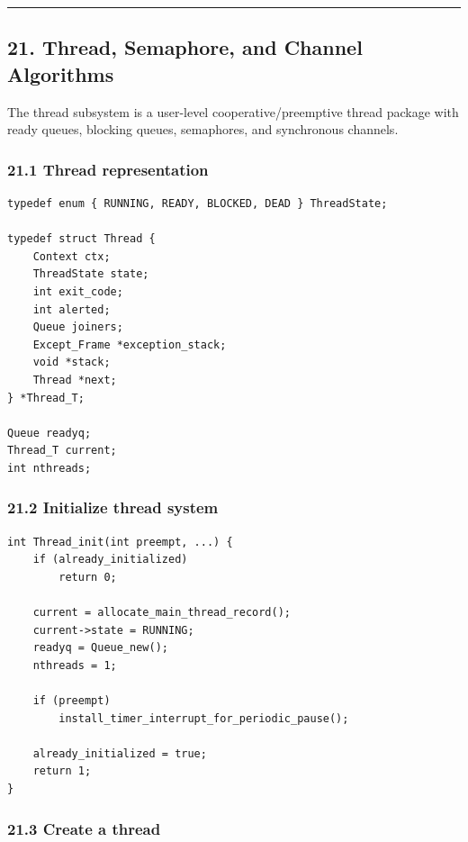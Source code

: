 \documentclass[11pt]{article}
\begin{document}
\begin{center}\rule{0.5\linewidth}{0.5pt}\end{center}

\subsection{21. Thread, Semaphore, and Channel Algorithms}\label{thread-semaphore-and-channel-algorithms}

The thread subsystem is a user-level cooperative/preemptive thread package with ready queues, blocking queues, semaphores, and synchronous channels.

\subsubsection{21.1 Thread representation}\label{thread-representation}

\begin{verbatim}
typedef enum { RUNNING, READY, BLOCKED, DEAD } ThreadState;

typedef struct Thread {
    Context ctx;
    ThreadState state;
    int exit_code;
    int alerted;
    Queue joiners;
    Except_Frame *exception_stack;
    void *stack;
    Thread *next;
} *Thread_T;

Queue readyq;
Thread_T current;
int nthreads;
\end{verbatim}

\subsubsection{21.2 Initialize thread system}\label{initialize-thread-system}

\begin{verbatim}
int Thread_init(int preempt, ...) {
    if (already_initialized)
        return 0;

    current = allocate_main_thread_record();
    current->state = RUNNING;
    readyq = Queue_new();
    nthreads = 1;

    if (preempt)
        install_timer_interrupt_for_periodic_pause();

    already_initialized = true;
    return 1;
}
\end{verbatim}

\subsubsection{21.3 Create a thread}\label{create-a-thread}
\end{document}
